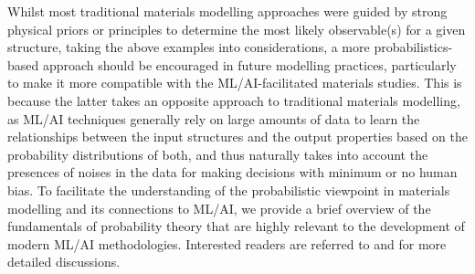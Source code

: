 Whilst most traditional materials modelling approaches were guided by strong physical priors or principles to determine the most likely observable(s) for a given structure, taking the above examples into considerations, a more probabilistics-based approach should be encouraged in future modelling practices, particularly to make it more compatible with the ML/AI-facilitated materials studies. This is because the latter takes an opposite approach to traditional materials modelling, as ML/AI techniques generally rely on large amounts of data to learn the relationships between the input structures and the output properties based on the probability distributions of both, and thus naturally takes into account the presences of noises in the data for making decisions with minimum or no human bias.  To facilitate the understanding of the probabilistic viewpoint in materials modelling and its connections to ML/AI, we provide a brief overview of the fundamentals of probability theory that are highly relevant to the development of modern ML/AI methodologies. Interested readers are referred to \citet{murphy2012machine} and \citet{goodfellow2016deep} for more detailed discussions.
